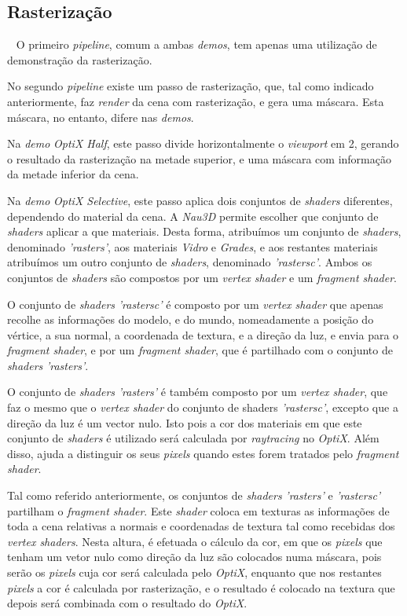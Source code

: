 \documentclass[10pt]{article}
\begin{document}
\subsection{Rasterização}~
O primeiro \textit{pipeline}, comum a ambas \textit{demos}, tem apenas uma utilização de demonstração da rasterização.

No segundo \textit{pipeline} existe um passo de rasterização, que, tal como indicado anteriormente, faz \textit{render} da cena com rasterização, e gera uma máscara. Esta máscara, no entanto, difere nas \textit{demos}.

Na \textit{demo} \textit{OptiX Half}, este passo divide horizontalmente o \textit{viewport} em 2, gerando o resultado da rasterização na metade superior, e uma máscara com informação da metade inferior da cena.

Na \textit{demo} \textit{OptiX Selective}, este passo aplica dois conjuntos de \textit{shaders} diferentes, dependendo do material da cena. A \textit{Nau3D} permite escolher que conjunto de \textit{shaders} aplicar a que materiais. Desta forma, atribuímos um conjunto de \textit{shaders}, denominado \textit{'rasters'}, aos materiais \textit{Vidro} e \textit{Grades}, e aos restantes materiais atribuímos um outro conjunto de \textit{shaders}, denominado \textit{'rastersc'}. Ambos os conjuntos de \textit{shaders} são compostos por um \textit{vertex shader} e um \textit{fragment shader}.

O conjunto de \textit{shaders} \textit{'rastersc'} é composto por um \textit{vertex shader} que apenas recolhe as informações do modelo, e do mundo, nomeadamente a posição do vértice, a sua normal, a coordenada de textura, e a direção da luz, e envia para o \textit{fragment shader}, e por um \textit{fragment shader}, que é partilhado com o conjunto de \textit{shaders} \textit{'rasters'}.

O conjunto de \textit{shaders} \textit{'rasters'} é também composto por um \textit{vertex shader}, que faz o mesmo que o \textit{vertex shader} do conjunto de shaders \textit{'rastersc'}, excepto que a direção da luz é um vector nulo. Isto pois a cor dos materiais em que este conjunto de \textit{shaders} é utilizado será calculada por \textit{raytracing} no \textit{OptiX}. Além disso, ajuda a distinguir os seus \textit{pixels} quando estes forem tratados pelo \textit{fragment shader}.

Tal como referido anteriormente, os conjuntos de \textit{shaders} \textit{'rasters'} e \textit{'rastersc'} partilham o \textit{fragment shader}. Este \textit{shader} coloca em texturas as informações de toda a cena relativas a normais e coordenadas de textura tal como recebidas dos \textit{vertex shaders}. Nesta altura, é efetuada o cálculo da cor, em que os \textit{pixels} que tenham um vetor nulo como direção da luz são colocados numa máscara, pois serão os \textit{pixels} cuja cor será calculada pelo \textit{OptiX}, enquanto que nos restantes \textit{pixels} a cor é calculada por rasterização, e o resultado é colocado na textura que depois será combinada com o resultado do \textit{OptiX}.
\end{document}
